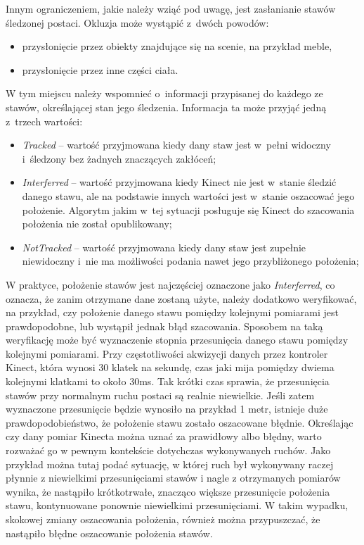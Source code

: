 Innym ograniczeniem, jakie należy wziąć pod uwagę, jest zasłanianie stawów śledzonej postaci. Okluzja może wystąpić z~dwóch powodów:
\begin{itemize}
	\item przysłonięcie przez obiekty znajdujące się na scenie, na przykład meble,
	\item przysłonięcie przez inne części ciała.
\end{itemize}
																																			
W tym miejscu należy wspomnieć o~informacji przypisanej do każdego ze stawów, określającej stan jego śledzenia. Informacja ta może przyjąć jedną z~trzech wartości:
\begin{itemize}
	\item \emph{Tracked} -- wartość przyjmowana kiedy dany staw jest w~pełni widoczny i~śledzony bez żadnych znaczących zakłóceń;
	\item \emph{Interferred} -- wartość przyjmowana kiedy Kinect nie jest w~stanie śledzić danego stawu, ale na podstawie innych wartości jest w~stanie oszacować jego położenie. Algorytm jakim w~tej sytuacji posługuje się Kinect do szacowania położenia nie został opublikowany;
	\item \emph{NotTracked} -- wartość przyjmowana kiedy dany staw jest zupełnie niewidoczny i~nie ma możliwości podania nawet jego przybliżonego położenia;
\end{itemize}
																																			
W praktyce, położenie stawów jest najczęściej oznaczone jako \emph{Interferred}, co oznacza, że zanim otrzymane dane zostaną użyte, należy dodatkowo weryfikować, na przykład, czy położenie danego stawu pomiędzy kolejnymi pomiarami jest prawdopodobne, lub wystąpił jednak błąd szacowania. Sposobem na taką weryfikację może być wyznaczenie stopnia przesunięcia danego stawu pomiędzy kolejnymi pomiarami. Przy częstotliwości akwizycji danych przez kontroler Kinect, która wynosi 30 klatek na sekundę, czas jaki mija pomiędzy dwiema kolejnymi klatkami to około 30ms. Tak krótki czas sprawia, że przesunięcia stawów przy normalnym ruchu postaci są realnie niewielkie. Jeśli zatem wyznaczone przesunięcie będzie wynosiło na przykład 1 metr, istnieje duże prawdopodobieństwo, że położenie stawu zostało oszacowane błędnie. Określając czy dany pomiar Kinecta można uznać za prawidłowy albo błędny, warto rozważać go w pewnym kontekście dotychczas wykonywanych ruchów. Jako przykład można tutaj podać sytuację, w której ruch był wykonywany raczej płynnie z niewielkimi przesunięciami stawów i nagle z otrzymanych pomiarów wynika, że nastąpiło krótkotrwałe, znacząco większe przesunięcie położenia stawu, kontynuowane ponownie niewielkimi przesunięciami. W takim wypadku, skokowej zmiany oszacowania położenia, również można przypuszczać, że nastąpiło błędne oszacowanie położenia stawów.
																																			
